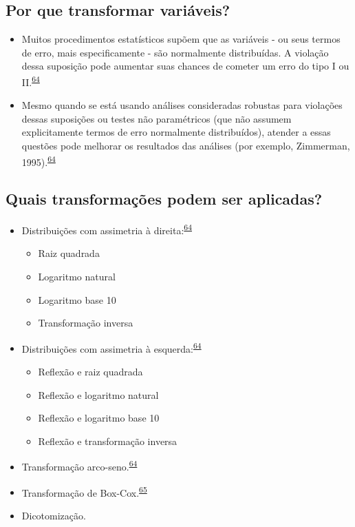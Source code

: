 \documentclass[
  a4paper,
]{book}
\begin{document}
\hypertarget{por-que-transformar-variuxe1veis}{%
\subsection{Por que transformar variáveis?}\label{por-que-transformar-variuxe1veis}}

\begin{itemize}
\item
  Muitos procedimentos estatísticos supõem que as variáveis - ou seus termos de erro, mais especificamente - são normalmente distribuídas. A violação dessa suposição pode aumentar suas chances de cometer um erro do tipo I ou II.\textsuperscript{\protect\hyperlink{ref-osborne2010}{64}}
\item
  Mesmo quando se está usando análises consideradas robustas para violações dessas suposições ou testes não paramétricos (que não assumem explicitamente termos de erro normalmente distribuídos), atender a essas questões pode melhorar os resultados das análises (por exemplo, Zimmerman, 1995).\textsuperscript{\protect\hyperlink{ref-osborne2010}{64}}
\end{itemize}

\hypertarget{quais-transformauxe7uxf5es-podem-ser-aplicadas}{%
\subsection{Quais transformações podem ser aplicadas?}\label{quais-transformauxe7uxf5es-podem-ser-aplicadas}}

\begin{itemize}
\item
  Distribuições com assimetria à direita:\textsuperscript{\protect\hyperlink{ref-osborne2010}{64}}

  \begin{itemize}
  \item
    Raiz quadrada
  \item
    Logaritmo natural
  \item
    Logaritmo base 10
  \item
    Transformação inversa
  \end{itemize}
\item
  Distribuições com assimetria à esquerda:\textsuperscript{\protect\hyperlink{ref-osborne2010}{64}}

  \begin{itemize}
  \item
    Reflexão e raiz quadrada
  \item
    Reflexão e logaritmo natural
  \item
    Reflexão e logaritmo base 10
  \item
    Reflexão e transformação inversa
  \end{itemize}
\item
  Transformação arco-seno.\textsuperscript{\protect\hyperlink{ref-osborne2010}{64}}
\item
  Transformação de Box-Cox.\textsuperscript{\protect\hyperlink{ref-box1964}{65}}
\item
  Dicotomização.
\end{itemize}
\end{document}

